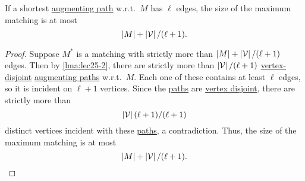 \begin{lemma}\label{lma:lec25-5}
	If a shortest \hyperref[def:augmenting-path]{augmenting path} w.r.t.\ \(M\) has \(\ell \) edges, the size of the maximum matching is at most
	\[
		\left\vert M \right\vert + \left\vert \mathcal{\MakeUppercase{v}}  \right\vert / (\ell +1).
	\]
\end{lemma}
\begin{proof}
	Suppose \(M^{\ast} \) is a matching with strictly more than \(\left\vert M \right\vert + \left\vert \mathcal{\MakeUppercase{V}}  \right\vert / (\ell +1)\) edges. Then by \autoref{lma:lec25-2}, there are strictly more than \(\left\vert \mathcal{\MakeUppercase{V}}  \right\vert / (\ell +1)\) \hyperref[def:vertex-independent]{vertex-disjoint} \hyperref[def:augmenting-path]{augmenting paths} w.r.t.\ \(M\). Each one of these contains at least \(\ell \) edges, so it is incident on \(\ell +1\) vertices. Since the \hyperref[def:path]{paths} are \hyperref[def:vertex-independent]{vertex disjoint}, there are strictly more than
	\[
		\left\vert \mathcal{\MakeUppercase{v}}  \right\vert (\ell + 1) / (\ell +1)
	\]
	distinct vertices incident with these \hyperref[def:path]{paths}, a contradiction. Thus, the size of the maximum matching is at most
	\[
		\left\vert M \right\vert + \left\vert \mathcal{\MakeUppercase{v}}  \right\vert / (\ell +1).
	\]
\end{proof}

